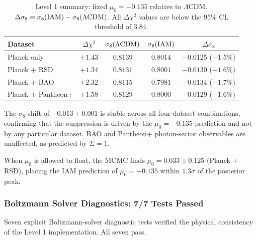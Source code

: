 \documentclass[twocolumn,a4paper,aps,prd,twocolumn,showpacs,notitlepage,superscriptaddress,nofootinbib]{article}
\newcommand{\LCDM}{$\Lambda$CDM}
\newcommand{\Dchisq}{\Delta\chi^{2}}
\begin{document}
\begin{table}[t]
  \centering
  \caption{Level 1 summary: fixed $\mu_0 = -0.135$ relative to \LCDM{}.
    $\Delta\sigma_8 \equiv \sigma_8(\rm IAM) - \sigma_8(\rm \Lambda CDM)$.
    All $\Dchisq$ values are below the $95\%$ CL threshold of $3.84$.}
  \label{tab:level1}
  \begin{tabular}{lcccc}
    \toprule
    Dataset & $\Dchisq$ & $\sigma_8(\rm \Lambda CDM)$ & $\sigma_8(\rm IAM)$
      & $\Delta\sigma_8$ \\
    \midrule
    Planck only & $+1.43$ & $0.8139$ & $0.8014$ & $-0.0125$ ($-1.5\%$) \\
    Planck + RSD & $+1.34$ & $0.8131$ & $0.8001$ & $-0.0130$ ($-1.6\%$) \\
    Planck + BAO & $+2.32$ & $0.8115$ & $0.7981$ & $-0.0134$ ($-1.7\%$) \\
    Planck + Pantheon+ & $+1.58$ & $0.8129$ & $0.8000$ & $-0.0129$ ($-1.6\%$) \\
    \bottomrule
  \end{tabular}
\end{table}

The $\sigma_8$ shift of $-0.013 \pm 0.001$ is stable across all four dataset
combinations, confirming that the suppression is driven by the $\mu_0 = -0.135$
prediction and not by any particular dataset.  BAO and Pantheon+ photon-sector
observables are unaffected, as predicted by $\Sigma = 1$.

When $\mu_0$ is allowed to float, the MCMC finds $\mu_0 = 0.033 \pm 0.125$
(Planck + RSD), placing the IAM prediction of $\mu_0 = -0.135$ within
$1.3\sigma$ of the posterior peak.

\subsubsection{Boltzmann Solver Diagnostics: 7/7 Tests Passed}

Seven explicit Boltzmann-solver diagnostic tests verified the physical
consistency of the Level 1 implementation.  All seven pass.
\end{document}
